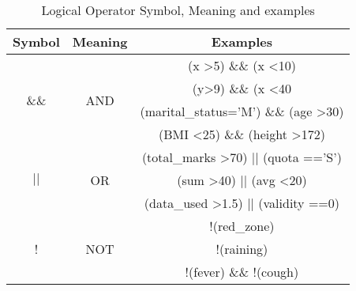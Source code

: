 \begin{table}[]
    \centering
    \begin{tabular}{|c|c|c|} \hline
         \textbf{Symbol} & \textbf{Meaning} & \textbf{Examples} \\ \hline
        \multirow{4}{*}{\&\&}   & \multirow{4}{*}{AND} & (x \textgreater 5) \&\& (x \textless 10)        \\ 
         &          &  (y\textgreater 9)  \&\& (x \textless 40  \\ 
        &     & (marital\_status='M') \&\& (age \textgreater 30) \\ 
        &         & (BMI \textless 25) \&\& (height \textgreater 172)
        \\ \hline 
        
     \multirow{3}{*}{$||$}   & \multirow{3}{*}{OR}  & (total\_marks \textgreater 70) $||$ (quota =='S') \\
        &  & (sum \textgreater 40) $||$ (avg \textless20)    \\
        & & (data\_used \textgreater 1.5) $||$ (validity ==0) \\ \hline
       \multirow{3}{*}{!}   & \multirow{3}{*}{NOT} &  !(red\_zone)\\ 
       
       & & !(raining) \\ 
       & &  !(fever) \&\& !(cough) \\ \hline
       
    
    \end{tabular}
    
    \caption{Logical Operator Symbol, Meaning and examples}
\end{table}